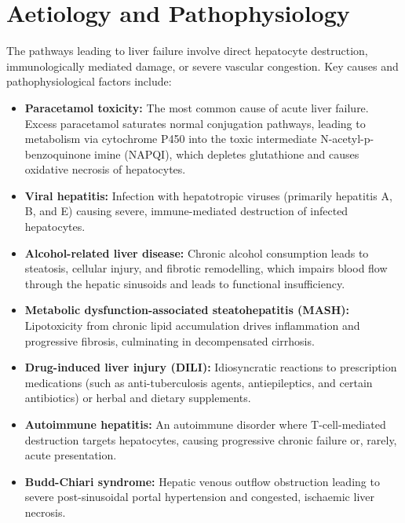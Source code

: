 \section*{Aetiology and Pathophysiology}
The pathways leading to liver failure involve direct hepatocyte destruction, immunologically mediated damage, or severe vascular congestion. Key causes and pathophysiological factors include:
\begin{itemize}
    \item \textbf{Paracetamol toxicity:} The most common cause of acute liver failure. Excess paracetamol saturates normal conjugation pathways, leading to metabolism via cytochrome P450 into the toxic intermediate N-acetyl-p-benzoquinone imine (NAPQI), which depletes glutathione and causes oxidative necrosis of hepatocytes.
    \item \textbf{Viral hepatitis:} Infection with hepatotropic viruses (primarily hepatitis A, B, and E) causing severe, immune-mediated destruction of infected hepatocytes.
    \item \textbf{Alcohol-related liver disease:} Chronic alcohol consumption leads to steatosis, cellular injury, and fibrotic remodelling, which impairs blood flow through the hepatic sinusoids and leads to functional insufficiency.
    \item \textbf{Metabolic dysfunction-associated steatohepatitis (MASH):} Lipotoxicity from chronic lipid accumulation drives inflammation and progressive fibrosis, culminating in decompensated cirrhosis.
    \item \textbf{Drug-induced liver injury (DILI):} Idiosyncratic reactions to prescription medications (such as anti-tuberculosis agents, antiepileptics, and certain antibiotics) or herbal and dietary supplements.
    \item \textbf{Autoimmune hepatitis:} An autoimmune disorder where T-cell-mediated destruction targets hepatocytes, causing progressive chronic failure or, rarely, acute presentation.
    \item \textbf{Budd-Chiari syndrome:} Hepatic venous outflow obstruction leading to severe post-sinusoidal portal hypertension and congested, ischaemic liver necrosis.
\end{itemize}


